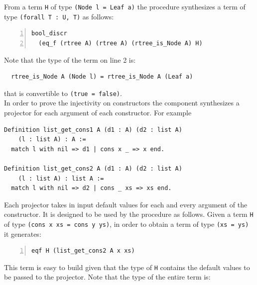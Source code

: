 \documentclass[sigplan,10pt,review]{acmart}\settopmatter{printfolios=true,printccs=false,printacmref=false}
\newcommand{\derive}[1]{\keys{#1}}
\begin{document}
\noindent
From a term \lstinline+H+ of type 
\lstinline+(Node l = Leaf a)+ the \derive{discriminate} procedure
synthesizes a term of type \lstinline+(forall T : U, T)+ as follows:

\begin{minipage}{\textwidth}\begin{lstlisting}[numbers=left]
bool_discr
  (eq_f (rtree A) (rtree A) (rtree_is_Node A) H)
\end{lstlisting}\end{minipage}

\noindent
Note that the type of the term on line 2 is:

\begin{minipage}{\textwidth}\begin{lstlisting}
  rtree_is_Node A (Node l) = rtree_is_Node A (Leaf a)
\end{lstlisting}\end{minipage}

\noindent
that is convertible to \lstinline+(true = false)+.
\\

In order to prove the injectivity on constructors the \derive{projK}
component synthesizes a projector for each argument of each constructor.
For example

\begin{minipage}{\textwidth}\begin{lstlisting}
Definition list_get_cons1 A (d1 : A) (d2 : list A)
    (l : list A) : A :=
  match l with nil => d1 | cons x _ => x end.

Definition list_get_cons2 A (d1 : A) (d2 : list A)
    (l : list A) : list A :=
  match l with nil => d2 | cons _ xs => xs end.
\end{lstlisting}\end{minipage}

\noindent
Each projector takes in input default values for each and every
argument of the constructor. It is designed to be used by the
\derive{injection} procedure as follows. Given a term
\lstinline+H+ of type \lstinline+(cons x xs = cons y ys)+, in order
to obtain a term of type \lstinline+(xs = ys)+ it generates:

\begin{minipage}{\textwidth}\begin{lstlisting}[numbers=left]
eqf H (list_get_cons2 A x xs)
\end{lstlisting}\end{minipage}

\noindent
This term is easy to build given that the type of \lstinline+H+
contains the default values to be passed to the projector.
Note that the type of the entire term is:
\end{document}
